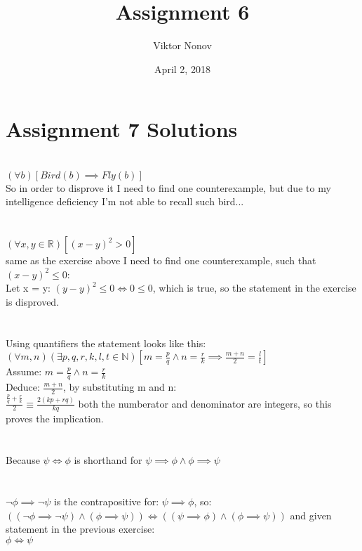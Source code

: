 \documentclass{article}
\title{Assignment 6}
\author{Viktor Nonov}
\date{April 2, 2018}
\begin{document}
\section*{Assignment 7 Solutions}

\section{}
$(\forall b)[Bird(b) \implies Fly(b)]$ \\
So in order to disprove it I need to find one counterexample, but due to my intelligence deficiency I'm not able to recall such bird...

\section{}
$(\forall x,y \in \mathbb{R})[(x - y)^2 > 0]$ \\
same as the exercise above I need to find one counterexample, such that $(x-y)^2 \leq 0$:\\
Let x = y: $(y - y)^2 \leq 0 \Leftrightarrow 0 \leq 0$, which is true, so the statement in the exercise is disproved.

\section{}
Using quantifiers the statement looks like this:\\
$(\forall m, n)(\exists p,q,r,k,l,t \in \mathbb{N})[m = \frac{p}{q} \wedge n = \frac{r}{k} \implies \frac{m+n}{2} = \frac{l}{t}]$\\
Assume: $m = \frac{p}{q} \wedge n = \frac{r}{k}$\\
Deduce: $\frac{m+n}{2}$, by substituting m and n:\\
$\frac{\frac{p}{q} + \frac{r}{k}}{2} \equiv \frac{2(kp + rq)}{kq}$ both the numberator and denominator are integers, so this proves the implication.

\section{}
Because $\psi \Leftrightarrow \phi$ is shorthand for $\psi \implies \phi \wedge \phi \implies \psi$ \\

\section{}
$\neg \phi \implies \neg \psi$ is the contrapositive for: $\psi \implies \phi$, so:\\
$((\neg \phi \implies \neg \psi) \wedge (\phi \implies \psi)) \Leftrightarrow ((\psi \implies \phi) \wedge (\phi \implies \psi))$ and given statement in the previous exercise: \\ $\phi \Leftrightarrow \psi$
\end{document}
